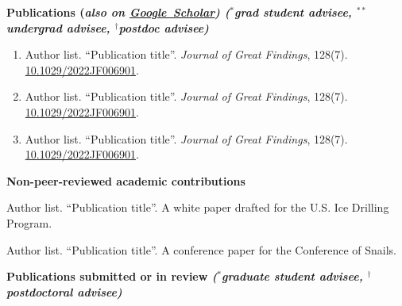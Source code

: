 \documentclass[letterpaper,11pt]{article}
\makeatletter
\renewenvironment{description}%
               {\list{}{\leftmargin=5pt %
                        \labelwidth\z@ \itemindent-\leftmargin
                        \let\makelabel\descriptionlabel}}%
               {\endlist}
\newcommand{\resheading}[1]{{\large \colorbox{mygrey}{\begin{minipage}{\textwidth}{\textbf{#1 \vphantom{p\^{E}}}}\end{minipage}}}}
\makeatother
\begin{document}
\vspace{0.1cm}



\resheading{Publications  \hspace{0.1cm}  \footnotesize{(\textit{also on \href{http://scholar.google.com}{\underline{Google~Scholar}})    \hspace{0.1cm} \footnotesize($^*$grad student advisee, $^{**}$undergrad advisee, $^\dagger$postdoc advisee)}}}


 
\begin{enumerate}

\item Author list.  ``Publication title''.  \textit{Journal of Great Findings}, 128(7).  \href{https://doi.org/10.1029/2022JF006901}{10.1029/2022JF006901}.

\item Author list.  ``Publication title''.  \textit{Journal of Great Findings}, 128(7).  \href{https://doi.org/10.1029/2022JF006901}{10.1029/2022JF006901}.

\item Author list.  ``Publication title''.  \textit{Journal of Great Findings}, 128(7).  \href{https://doi.org/10.1029/2022JF006901}{10.1029/2022JF006901}.

\end{enumerate}





\resheading{\small{\hspace{0.2in}Non-peer-reviewed academic contributions}} 
 
 \begin{description}

	\item  Author list.  ``Publication title''. A white paper drafted for the U.S. Ice Drilling Program.
	\item  Author list.  ``Publication title''. A conference paper for the Conference of Snails.

\end{description}




\vspace{-4pt}

 \resheading{\small{\hspace{0.2in}Publications submitted or in review   { \hspace{1cm} \textit{\footnotesize($^*$graduate student advisee, $^\dagger$postdoctoral advisee)}}}}
\end{document}
